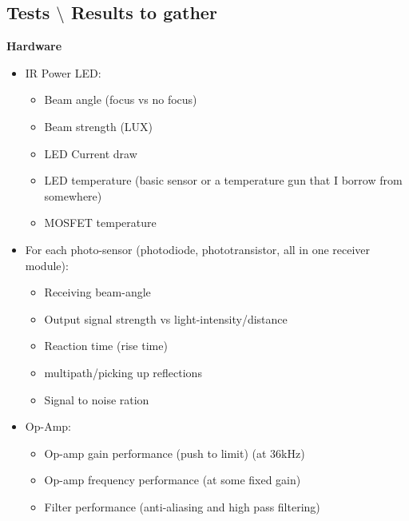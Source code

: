 \newpage
\subsection{Tests $\setminus$ Results to gather}
\textbf{Hardware}
\begin{itemize}
	\item IR Power LED:
	\begin{itemize}
		\item Beam angle (focus vs no focus)
		\item Beam strength (LUX)
		\item LED Current draw
		\item LED temperature (basic sensor or a temperature gun that I borrow from somewhere)
		\item MOSFET temperature
	\end{itemize}
	\item For each photo-sensor (photodiode, phototransistor, all in one receiver module):
	\begin{itemize}
		\item Receiving beam-angle
		\item Output signal strength vs light-intensity/distance
		\item Reaction time (rise time)
		\item multipath/picking up reflections
		\item Signal to noise ration
	\end{itemize}
	\item Op-Amp:
	\begin{itemize}
		\item Op-amp gain performance (push to limit) (at 36kHz)
		\item Op-amp frequency performance (at some fixed gain)
		\item Filter performance (anti-aliasing and high pass filtering)
	\end{itemize}
\end{itemize}

